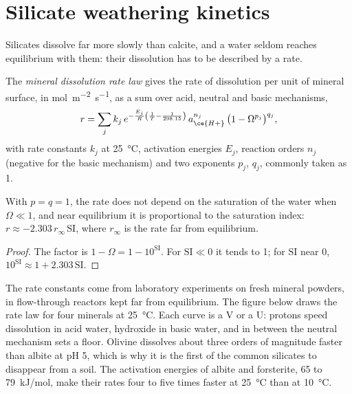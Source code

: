 \section{Silicate weathering kinetics}\label{sec:b3:water-rock-interaction:kinetics}

Silicates dissolve far more slowly than calcite, and a water seldom reaches
equilibrium with them: their dissolution has to be described by a rate.

\begin{definition}\label{def:b3:water-rock-interaction:rate-law}
The \emph{mineral dissolution rate law}
gives the rate of dissolution per unit of mineral surface, in
\unit{mol.m^{-2}.s^{-1}}, as a sum over acid, neutral and basic mechanisms,
\[
r = \sum_j k_j\,e^{-\frac{E_j}{R}\left(\frac1T - \frac1{298.15}\right)}\,
a_{\ce{H+}}^{n_j}\,\bigl(1 - \Omega^{p_j}\bigr)^{q_j},
\]
with rate constants $k_j$ at \qty{25}{\celsius}, activation energies $E_j$,
reaction orders $n_j$ (negative for the basic mechanism) and two exponents
$p_j$, $q_j$, commonly taken as 1.
\end{definition}

\begin{proposition}\label{prop:b3:water-rock-interaction:affinity}
With $p = q = 1$, the rate does not depend on the saturation of the water
when $\Omega \ll 1$, and near equilibrium it is proportional to the
saturation index: $r \approx -2.303\,r_\infty\,\mathrm{SI}$, where
$r_\infty$ is the rate far from equilibrium.
\end{proposition}

\begin{proof}
The factor is $1 - \Omega = 1 - 10^{\mathrm{SI}}$. For $\mathrm{SI} \ll 0$ it
tends to 1; for $\mathrm{SI}$ near 0, $10^{\mathrm{SI}} \approx 1 +
2.303\,\mathrm{SI}$.
\end{proof}

The rate constants come from laboratory experiments on fresh mineral powders,
in flow-through reactors kept far from equilibrium. The figure below draws
the rate law for four minerals at \qty{25}{\celsius}. Each curve is a V or a
U: protons speed dissolution in acid water, hydroxide in basic water, and in
between the neutral mechanism sets a floor. Olivine dissolves about three
orders of magnitude faster than albite at pH 5, which is why it is the first
of the common silicates to disappear from a soil. The activation energies of
albite and forsterite, 65 to \qty{79}{kJ/mol}, make their rates four to five
times faster at \qty{25}{\celsius} than at \qty{10}{\celsius}.

